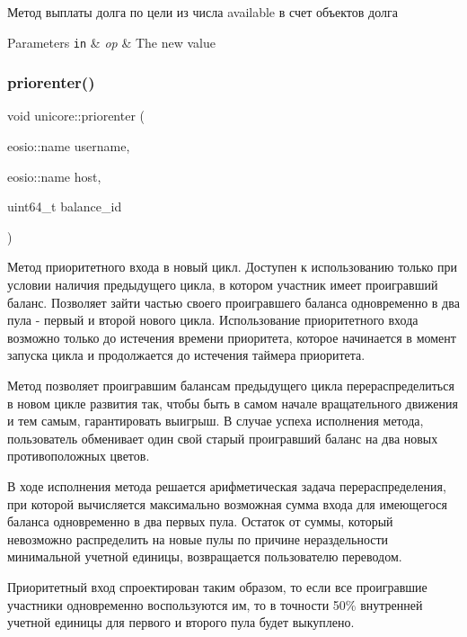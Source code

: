 Метод выплаты долга по цели из числа available в счет объектов долга 


\begin{DoxyParams}[1]{Parameters}
\mbox{\tt in}  & {\em op} & The new value \\
\hline
\end{DoxyParams}
\mbox{\label{classunicore_a7c554fbaa488514c2fd09879a6b4c662}} 
\subsubsection{\texorpdfstring{priorenter()}{priorenter()}}
{\footnotesize\ttfamily void unicore\+::priorenter (\begin{DoxyParamCaption}\item[{eosio\+::name}]{username,  }\item[{eosio\+::name}]{host,  }\item[{uint64\+\_\+t}]{balance\+\_\+id }\end{DoxyParamCaption})}



Метод приоритетного входа в новый цикл. Доступен к использованию только при условии наличия предыдущего цикла, в котором участник имеет проигравший баланс. Позволяет зайти частью своего проигравшего баланса одновременно в два пула -\/ первый и второй нового цикла. Использование приоритетного входа возможно только до истечения времени приоритета, которое начинается в момент запуска цикла и продолжается до истечения таймера приоритета. 

Метод позволяет проигравшим балансам предыдущего цикла перераспределиться в новом цикле развития так, чтобы быть в самом начале вращательного движения и тем самым, гарантировать выигрыш. В случае успеха исполнения метода, пользователь обменивает один свой старый проигравший баланс на два новых противоположных цветов.

В ходе исполнения метода решается арифметическая задача перераспределения, при которой вычисляется максимально возможная сумма входа для имеющегося баланса одновременно в два первых пула. Остаток от суммы, который невозможно распределить на новые пулы по причине нераздельности минимальной учетной единицы, возвращается пользователю переводом.

Приоритетный вход спроектирован таким образом, то если все проигравшие участники одновременно воспользуются им, то в точности 50\% внутренней учетной единицы для первого и второго пула будет выкуплено.

